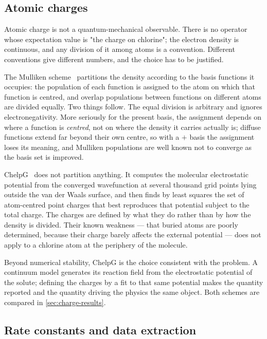 \documentclass[10pt,a4paper]{article}
\begin{document}
\subsection{Atomic charges}
\label{sec:charges}

Atomic charge is not a quantum-mechanical observable. There is no operator whose
expectation value is "the charge on chlorine"; the electron density is continuous,
and any division of it among atoms is a convention. Different conventions give
different numbers, and the choice has to be justified.

The Mulliken scheme~\cite{Mulliken1955} partitions the density according to the
basis functions it occupies: the population of each function is assigned to the atom
on which that function is centred, and overlap populations between functions on
different atoms are divided equally. Two things follow. The equal division is
arbitrary and ignores electronegativity. More seriously for the present basis, the
assignment depends on where a function is \emph{centred}, not on where the density
it carries actually is; diffuse functions extend far beyond their own centre, so
with a $+$ basis the assignment loses its meaning, and Mulliken populations are
well known not to converge as the basis set is improved.

ChelpG~\cite{Breneman1990} does not partition anything. It computes the molecular
electrostatic potential from the converged wavefunction at several thousand grid
points lying outside the van der Waals surface, and then finds by least squares the
set of atom-centred point charges that best reproduces that potential subject to the
total charge. The charges are defined by what they do rather than by how the density
is divided. Their known weakness --- that buried atoms are poorly determined, because
their charge barely affects the external potential --- does not apply to a chlorine
atom at the periphery of the molecule.

Beyond numerical stability, ChelpG is the choice consistent with the problem. A
continuum model generates its reaction field from the electrostatic potential of the
solute; defining the charges by a fit to that same potential makes the quantity
reported and the quantity driving the physics the same object. Both schemes are
compared in \cref{sec:charge-results}.

\subsection{Rate constants and data extraction}
\end{document}

